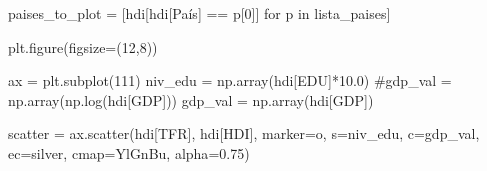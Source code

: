 \documentclass[
  letterpaper,
  DIV=11,
  numbers=noendperiod]{scrreprt}
\newenvironment{Shaded}{\begin{snugshade}}{\end{snugshade}}
\newcommand{\CommentTok}[1]{\textcolor[rgb]{0.37,0.37,0.37}{#1}}
\newcommand{\ControlFlowTok}[1]{\textcolor[rgb]{0.00,0.23,0.31}{#1}}
\newcommand{\DecValTok}[1]{\textcolor[rgb]{0.68,0.00,0.00}{#1}}
\newcommand{\FloatTok}[1]{\textcolor[rgb]{0.68,0.00,0.00}{#1}}
\newcommand{\KeywordTok}[1]{\textcolor[rgb]{0.00,0.23,0.31}{#1}}
\newcommand{\NormalTok}[1]{\textcolor[rgb]{0.00,0.23,0.31}{#1}}
\newcommand{\OperatorTok}[1]{\textcolor[rgb]{0.37,0.37,0.37}{#1}}
\newcommand{\StringTok}[1]{\textcolor[rgb]{0.13,0.47,0.30}{#1}}
\begin{document}
\begin{Shaded}
\begin{Highlighting}[]
\NormalTok{paises\_to\_plot }\OperatorTok{=}\NormalTok{ [hdi[hdi[}\StringTok{\textquotesingle{}País\textquotesingle{}}\NormalTok{] }\OperatorTok{==}\NormalTok{ p[}\DecValTok{0}\NormalTok{]] }\ControlFlowTok{for}\NormalTok{ p }\KeywordTok{in}\NormalTok{ lista\_paises]}

\NormalTok{plt.figure(figsize}\OperatorTok{=}\NormalTok{(}\DecValTok{12}\NormalTok{,}\DecValTok{8}\NormalTok{))}

\NormalTok{ax }\OperatorTok{=}\NormalTok{ plt.subplot(}\DecValTok{111}\NormalTok{)}
\NormalTok{niv\_edu }\OperatorTok{=}\NormalTok{ np.array(hdi[}\StringTok{\textquotesingle{}EDU\textquotesingle{}}\NormalTok{]}\OperatorTok{*}\FloatTok{10.0}\NormalTok{)}
\CommentTok{\#gdp\_val = np.array(np.log(hdi[\textquotesingle{}GDP\textquotesingle{}]))}
\NormalTok{gdp\_val }\OperatorTok{=}\NormalTok{ np.array(hdi[}\StringTok{\textquotesingle{}GDP\textquotesingle{}}\NormalTok{])}

\NormalTok{scatter }\OperatorTok{=}\NormalTok{ ax.scatter(hdi[}\StringTok{\textquotesingle{}TFR\textquotesingle{}}\NormalTok{], hdi[}\StringTok{\textquotesingle{}HDI\textquotesingle{}}\NormalTok{], marker}\OperatorTok{=}\StringTok{\textquotesingle{}o\textquotesingle{}}\NormalTok{, s}\OperatorTok{=}\NormalTok{niv\_edu, c}\OperatorTok{=}\NormalTok{gdp\_val, ec}\OperatorTok{=}\StringTok{\textquotesingle{}silver\textquotesingle{}}\NormalTok{, cmap}\OperatorTok{=}\StringTok{\textquotesingle{}YlGnBu\textquotesingle{}}\NormalTok{, alpha}\OperatorTok{=}\FloatTok{0.75}\NormalTok{)}


\end{Highlighting}
\end{Shaded}
\end{document}
